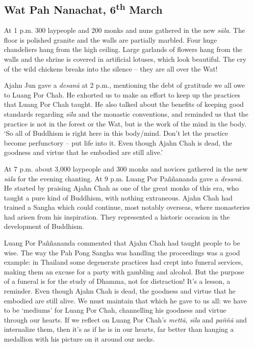 
\subsection*{Wat Pah Nanachat, 6\textsuperscript{th} March}

At 1 p.m. 300 laypeople and 200 monks and nuns gathered in the new
\emph{sāla}. The floor is polished granite and the walls are partially
marbled. Four huge chandeliers hang from the high ceiling. Large
garlands of flowers hang from the walls and the shrine is covered in
artificial lotuses, which look beautiful. The cry of the wild chickens
breaks into the silence -- they are all over the Wat! 

Ajahn Jun gave a \emph{desanā} at 2 p.m., mentioning the debt of gratitude we
all owe to Luang Por Chah. He exhorted us to make an effort to keep up
the practices that Luang Por Chah taught. He also talked about the
benefits of keeping good standards regarding \emph{sīla} and the monastic
conventions, and reminded us that the practice is not in the forest or
the Wat, but is the work of the mind in the body. `So all of Buddhism is
right here in this body/mind. Don't let the practice become perfunctory
-- put life into it. Even though Ajahn Chah is dead, the goodness and
virtue that he embodied are still alive.'

At 7 p.m. about 3,000 laypeople and 300 monks and novices gathered in the
new \emph{sāla} for the evening chanting. At 9 p.m. Luang Por Paññananda gave a
\emph{desanā}. He started by praising Ajahn Chah as one of the great
monks of this era, who taught a pure kind of Buddhism, with nothing
extraneous. Ajahn Chah had trained a Sangha which could continue, most
notably overseas, where monasteries had arisen from his inspiration. 
They represented a historic occasion in the development of Buddhism. 

Luang Por Paññananda commented that Ajahn Chah had taught people to be
wise. The way the Pah Pong Sangha was handling the proceedings was a
good example: in Thailand some degenerate practices had crept into
funeral services, making them an excuse for a party with gambling and
alcohol. But the purpose of a funeral is for the study of Dhamma, not
for distraction! It's a lesson, a reminder. Even though Ajahn Chah is
dead, the goodness and virtue that he embodied are still alive. We must
maintain that which he gave to us all: we have to be `mediums' for Luang
Por Chah, channelling his goodness and virtue through our hearts. If we
reflect on Luang Por Chah's \emph{mettā}, \emph{sīla} and \emph{paññā}
and internalize them, then it's as if he is in our hearts, far better
than hanging a medallion with his picture on it around our necks. 

